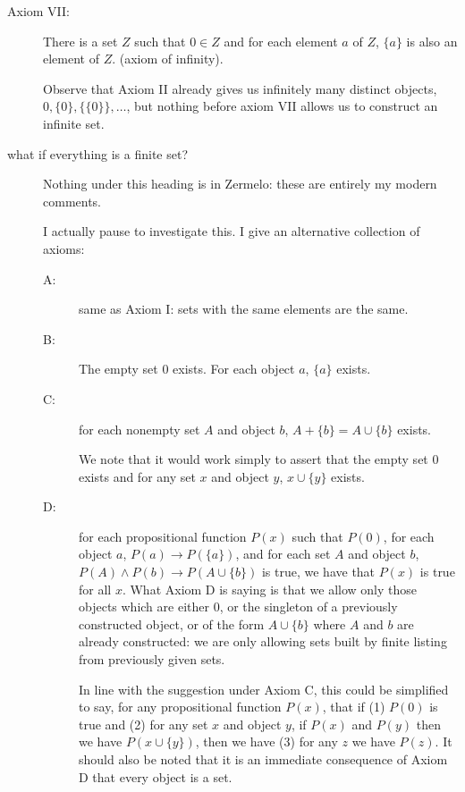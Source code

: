\documentclass[12pt]{article}
\begin{document}
\begin{enumerate}
\begin{description}
\item[Axiom VII:]  There is a set $Z$ such that $0 \in Z$ and for each element $a$ of $Z$, $\{a\}$ is also an element of $Z$. (axiom of infinity).

Observe that Axiom II already gives us infinitely many distinct objects, $0, \{0\}, \{\{0\}\},\ldots$, but nothing before axiom VII allows us to construct an infinite set.

\item[what if everything is a finite set?]  Nothing under this heading is in Zermelo:  these are entirely my modern comments.

I actually pause to investigate this.  I give an alternative collection of axioms:

\begin{description}

\item[A:]  same as Axiom I:  sets with the same elements are the same.

\item[B:]  The empty set 0 exists.  For each object $a$, $\{a\}$ exists.

\item[C:]  for each nonempty set $A$ and object $b$, $A + \{b\} = A \cup \{b\}$ exists.

We note that it would work simply to assert that the empty set 0 exists and for any set $x$ and object $y$, $x \cup \{y\}$ exists.

\item[D:]  for each propositional function $P(x)$ such that $P(0)$, for each object $a$, $P(a) \rightarrow P(\{a\})$, and for each set $A$ and object $b$,
$P(A) \wedge P(b) \rightarrow P(A \cup \{b\})$ is true, we have that $P(x)$ is true for all $x$.  What Axiom D is saying is that we allow only those objects which
are either 0, or the singleton of a previously constructed object, or of the form $A \cup \{b\}$ where $A$ and $b$ are already constructed:  we are only allowing sets built by finite listing from previously given sets.

In line with the suggestion under Axiom C, this could be simplified to say, for any propositional function $P(x)$, that if (1) $P(0)$ is true and (2) for any set $x$ and object $y$,
if $P(x)$ and $P(y)$ then we have $P(x \cup \{y\})$, then we have (3) for any $z$ we have $P(z)$.  It should also be noted that it is an immediate consequence of Axiom D that every object is a set.

\end{description}


\end{description}
\end{enumerate}
\end{document}
